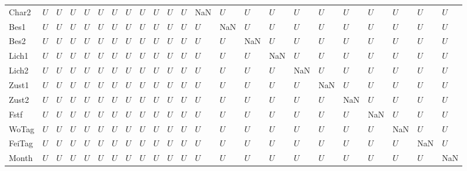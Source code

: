 \begin{tabular}{lllllllllllllllllllllll}
Char2   &     $U$ &  $U$ &  $U$ &   $U$ &   $U$ &   $U$ &   $U$ &   $U$ &   $U$ &   $U$ &   $U$ &   NaN &  $U$ &  $U$ &   $U$ &   $U$ &   $U$ &   $U$ &  $U$ &   $U$ &    $U$ &   $U$ \\
Bes1    &     $U$ &  $U$ &  $U$ &   $U$ &   $U$ &   $U$ &   $U$ &   $U$ &   $U$ &   $U$ &   $U$ &   $U$ &  NaN &  $U$ &   $U$ &   $U$ &   $U$ &   $U$ &  $U$ &   $U$ &    $U$ &   $U$ \\
Bes2    &     $U$ &  $U$ &  $U$ &   $U$ &   $U$ &   $U$ &   $U$ &   $U$ &   $U$ &   $U$ &   $U$ &   $U$ &  $U$ &  NaN &   $U$ &   $U$ &   $U$ &   $U$ &  $U$ &   $U$ &    $U$ &   $U$ \\
Lich1   &     $U$ &  $U$ &  $U$ &   $U$ &   $U$ &   $U$ &   $U$ &   $U$ &   $U$ &   $U$ &   $U$ &   $U$ &  $U$ &  $U$ &   NaN &   $U$ &   $U$ &   $U$ &  $U$ &   $U$ &    $U$ &   $U$ \\
Lich2   &     $U$ &  $U$ &  $U$ &   $U$ &   $U$ &   $U$ &   $U$ &   $U$ &   $U$ &   $U$ &   $U$ &   $U$ &  $U$ &  $U$ &   $U$ &   NaN &   $U$ &   $U$ &  $U$ &   $U$ &    $U$ &   $U$ \\
Zust1   &     $U$ &  $U$ &  $U$ &   $U$ &   $U$ &   $U$ &   $U$ &   $U$ &   $U$ &   $U$ &   $U$ &   $U$ &  $U$ &  $U$ &   $U$ &   $U$ &   NaN &   $U$ &  $U$ &   $U$ &    $U$ &   $U$ \\
Zust2   &     $U$ &  $U$ &  $U$ &   $U$ &   $U$ &   $U$ &   $U$ &   $U$ &   $U$ &   $U$ &   $U$ &   $U$ &  $U$ &  $U$ &   $U$ &   $U$ &   $U$ &   NaN &  $U$ &   $U$ &    $U$ &   $U$ \\
Fstf    &     $U$ &  $U$ &  $U$ &   $U$ &   $U$ &   $U$ &   $U$ &   $U$ &   $U$ &   $U$ &   $U$ &   $U$ &  $U$ &  $U$ &   $U$ &   $U$ &   $U$ &   $U$ &  NaN &   $U$ &    $U$ &   $U$ \\
WoTag   &     $U$ &  $U$ &  $U$ &   $U$ &   $U$ &   $U$ &   $U$ &   $U$ &   $U$ &   $U$ &   $U$ &   $U$ &  $U$ &  $U$ &   $U$ &   $U$ &   $U$ &   $U$ &  $U$ &   NaN &    $U$ &   $U$ \\
FeiTag  &     $U$ &  $U$ &  $U$ &   $U$ &   $U$ &   $U$ &   $U$ &   $U$ &   $U$ &   $U$ &   $U$ &   $U$ &  $U$ &  $U$ &   $U$ &   $U$ &   $U$ &   $U$ &  $U$ &   $U$ &    NaN &   $U$ \\
Month   &     $U$ &  $U$ &  $U$ &   $U$ &   $U$ &   $U$ &   $U$ &   $U$ &   $U$ &   $U$ &   $U$ &   $U$ &  $U$ &  $U$ &   $U$ &   $U$ &   $U$ &   $U$ &  $U$ &   $U$ &    $U$ &   NaN \\
\bottomrule
\end{tabular}
